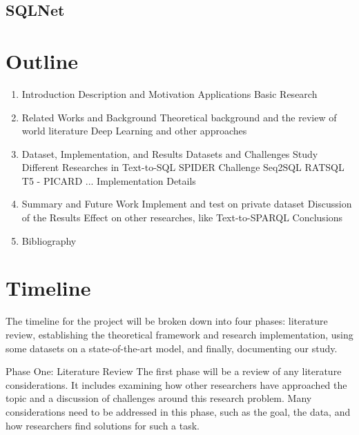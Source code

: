 \subsection{SQLNet}




\section{Outline}

\begin{enumerate}

\item Introduction
\subitem Description and Motivation
\subitem Applications
\subitem Basic Research
\item Related Works and Background
\subitem Theoretical background and the review of world literature
\subitem Deep Learning and other approaches
\item Dataset, Implementation, and Results
\subitem Datasets and Challenges
\subitem Study Different Researches in Text-to-SQL SPIDER Challenge
\subsubitem Seq2SQL
\subsubitem RATSQL
\subsubitem T5 - PICARD
\subsubitem ...
\subitem Implementation Details
\item Summary and Future Work
\subitem Implement and test on private dataset
\subitem Discussion of the Results
\subitem Effect on other researches, like Text-to-SPARQL
\subitem Conclusions
\item Bibliography

\end{enumerate}


\section{Timeline}

The timeline for the project will be broken down into four phases: literature review, establishing the theoretical framework and research implementation, using some datasets on a state-of-the-art model, and finally, documenting our study.

Phase One: Literature Review
The first phase will be a review of any literature considerations. It includes examining how other researchers have approached the topic and a discussion of challenges around this research problem. Many considerations need to be addressed in this phase, such as the goal, the data, and how researchers find solutions for such a task.

